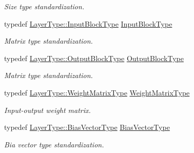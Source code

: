 \begin{DoxyCompactItemize}
\begin{DoxyCompactList}\small\item\em Size type standardization. \end{DoxyCompactList}\item 
typedef \hyperlink{classffnn_1_1layer_1_1_sparsely_connected_ad90fd9b4c687e4dc515cf8ca2796043c}{Layer\-Type\-::\-Input\-Block\-Type} \hyperlink{classffnn_1_1optimizer_1_1_adam_3_01layer_1_1_sparsely_connected_3_01_value_type_00_01_inputs_at5101e46d32858ec2169acdeede08d723_a91ec5d1a25381d6c8e864474bd5e5817}{Input\-Block\-Type}
\begin{DoxyCompactList}\small\item\em Matrix type standardization. \end{DoxyCompactList}\item 
typedef \hyperlink{classffnn_1_1layer_1_1_sparsely_connected_aacf4fb49a3f57aba90e55d8d3c63cf45}{Layer\-Type\-::\-Output\-Block\-Type} \hyperlink{classffnn_1_1optimizer_1_1_adam_3_01layer_1_1_sparsely_connected_3_01_value_type_00_01_inputs_at5101e46d32858ec2169acdeede08d723_ae206d0e2b950f865445e348697b9d6ab}{Output\-Block\-Type}
\begin{DoxyCompactList}\small\item\em Matrix type standardization. \end{DoxyCompactList}\item 
typedef \hyperlink{classffnn_1_1layer_1_1_sparsely_connected_acafafa368b81042965eed9607cad2dbd}{Layer\-Type\-::\-Weight\-Matrix\-Type} \hyperlink{classffnn_1_1optimizer_1_1_adam_3_01layer_1_1_sparsely_connected_3_01_value_type_00_01_inputs_at5101e46d32858ec2169acdeede08d723_a72391596a110863096101fc02984db1e}{Weight\-Matrix\-Type}
\begin{DoxyCompactList}\small\item\em Input-\/output weight matrix. \end{DoxyCompactList}\item 
typedef \hyperlink{classffnn_1_1layer_1_1_sparsely_connected_ad2d566cbb6c54c8723d79737075b4a00}{Layer\-Type\-::\-Bias\-Vector\-Type} \hyperlink{classffnn_1_1optimizer_1_1_adam_3_01layer_1_1_sparsely_connected_3_01_value_type_00_01_inputs_at5101e46d32858ec2169acdeede08d723_aa4156bd11aaf893cfed8f3390f29c182}{Bias\-Vector\-Type}
\begin{DoxyCompactList}\small\item\em Bia vector type standardization. \end{DoxyCompactList}\end{DoxyCompactItemize}
